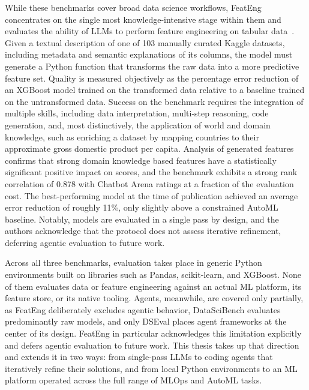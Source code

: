 \documentclass[
english,                 %
bibtex,                  %
]{kththesis}
\numberwithin{listing}{chapter}
\begin{document}
While these benchmarks cover broad data science workflows, \gls{FeatEng} concentrates on the single most knowledge-intensive stage within them and evaluates the ability of \glspl{LLM} to perform feature engineering on tabular data~\cite{pietruszka_can_2026}. Given a textual description of one of 103 manually curated Kaggle datasets, including metadata and semantic explanations of its columns, the model must generate a Python function that transforms the raw data into a more predictive feature set. Quality is measured objectively as the percentage error reduction of an \gls{XGBoost} model trained on the transformed data relative to a baseline trained on the untransformed data. Success on the benchmark requires the integration of multiple skills, including data interpretation, multi-step reasoning, code generation, and, most distinctively, the application of world and domain knowledge, such as enriching a dataset by mapping countries to their approximate gross domestic product per capita. Analysis of generated features confirms that strong domain knowledge based features have a statistically significant positive impact on scores, and the benchmark exhibits a strong rank correlation of 0.878 with Chatbot Arena ratings at a fraction of the evaluation cost. The best-performing model at the time of publication achieved an average error reduction of roughly 11\%, only slightly above a constrained \gls{AutoML} baseline. Notably, models are evaluated in a single pass by design, and the authors acknowledge that the protocol does not assess iterative refinement, deferring agentic evaluation to future work.

Across all three benchmarks, evaluation takes place in generic Python environments built on libraries such as Pandas, \gls{scikit}-learn, and \gls{XGBoost}. None of them evaluates data or feature engineering against an actual \gls{ML} platform, its feature store, or its native tooling. Agents, meanwhile, are covered only partially, as \gls{FeatEng} deliberately excludes agentic behavior, \gls{DataSciBench} evaluates predominantly raw models, and only DS\Gls{Eval} places agent frameworks at the center of its design. \Gls{FeatEng} in particular acknowledges this limitation explicitly and defers agentic evaluation to future work. This thesis takes up that direction and extends it in two ways: from single-pass \glspl{LLM} to coding agents that iteratively refine their solutions, and from local Python environments to an \gls{ML} platform operated across the full range of \gls{MLOps} and \gls{AutoML} tasks.
\end{document}
